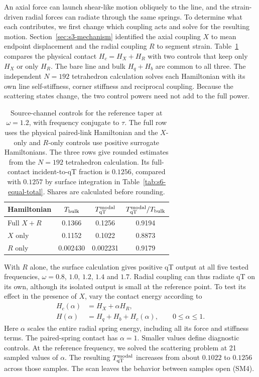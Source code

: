 \documentclass[10pt,aps,onecolumn,floatfix,notitlepage,nofootinbib,showkeys]{revtex4-2}
\newcommand{\qT}{\mathrm{qT}}
\begin{document}
An axial force can launch shear-like motion obliquely to the line, and the strain-driven radial forces can radiate through the same springs. To determine what each contributes, we first change which coupling acts and solve for the resulting motion. Section~\ref{sec:s3-mechanism} identified the axial coupling $X$ to mean endpoint displacement and the radial coupling $R$ to segment strain. Table~\ref{tab:s6-ablation} compares the physical contact $H_c=H_X+H_R$ with two controls that keep only $H_X$ or only $H_R$. The bare line and bulk $H_q+H_b$ are common to all three. The independent $N=192$ tetrahedron calculation solves each Hamiltonian with its own line self-stiffness, corner stiffness and reciprocal coupling. Because the scattering states change, the two control powers need not add to the full power.

\begin{table}[t]
 \squeezetable
 \caption{Source-channel controls for the reference taper at $\omega=1.2$, with frequency conjugate to $\tau$. The full row uses the physical paired-link Hamiltonian and the $X$-only and $R$-only controls use positive surrogate Hamiltonians. The three rows give rounded estimates from the $N=192$ tetrahedron calculation. Its full-contact incident-to-qT fraction is $0.1256$, compared with $0.1257$ by surface integration in Table~\ref{tab:s6-equal-total}. Shares are calculated before rounding.}
 \label{tab:s6-ablation}
 \begin{ruledtabular}
 \begin{tabular}{lccc}
 Hamiltonian & $T_{\rm bulk}$ & $T_{\qT}^{\rm modal}$ & $T_{\qT}^{\rm modal}/T_{\rm bulk}$\\
 \hline
 Full $X+R$ & 0.1366 & 0.1256 & 0.9194\\
 $X$ only & 0.1152 & 0.1022 & 0.8873\\
 $R$ only & 0.002430 & 0.002231 & 0.9179\\
 \end{tabular}
 \end{ruledtabular}
\end{table}

With $R$ alone, the surface calculation gives positive qT output at all five tested frequencies, $\omega=0.8$, $1.0$, $1.2$, $1.4$ and $1.7$. Radial coupling can thus radiate qT on its own, although its isolated output is small at the reference point. To test its effect in the presence of $X$, vary the contact energy according to
\begin{equation}
\begin{aligned}
 H_c(\alpha)&=H_X+\alpha H_R,\\
 H(\alpha)&=H_q+H_b+H_c(\alpha),
 \qquad0\leq\alpha\leq1.
\end{aligned}
 \label{eq:s6-alpha-family}
\end{equation}
Here $\alpha$ scales the entire radial spring energy, including all its force and stiffness terms. The paired-spring contact has $\alpha=1$. Smaller values define diagnostic controls. At the reference frequency, we solved the scattering problem at 21 sampled values of $\alpha$. The resulting $T_{\qT}^{\rm modal}$ increases from about $0.1022$ to $0.1256$ across those samples. The scan leaves the behavior between samples open (SM4).
\end{document}
